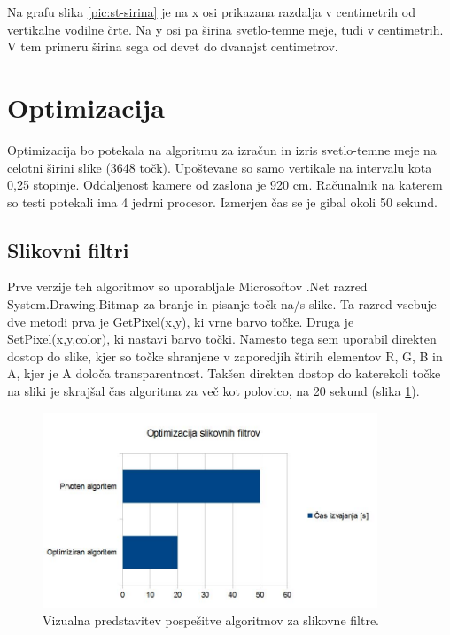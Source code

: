 \documentclass[oneside, a4paper, 12pt]{book}
\begin{document}
Na grafu slika \ref{pic:st-sirina} je na x osi prikazana razdalja v centimetrih od vertikalne vodilne črte. Na y osi pa širina svetlo-temne meje, tudi v centimetrih. V tem primeru širina sega od devet do dvanajst centimetrov.


\section{Optimizacija}
Optimizacija bo potekala na algoritmu za izračun in izris svetlo-temne meje na celotni širini slike (3648 točk). Upoštevane so samo vertikale na intervalu kota 0,25 stopinje. Oddaljenost kamere od zaslona je 920 cm. Računalnik na katerem so testi potekali ima 4 jedrni procesor. Izmerjen čas se je gibal okoli 50 sekund.

\subsection{Slikovni filtri}
Prve verzije teh algoritmov so uporabljale Microsoftov .Net razred System.Drawing.Bitmap za branje in pisanje točk na/s slike. Ta razred vsebuje dve metodi prva je GetPixel(x,y), ki vrne barvo točke. Druga je SetPixel(x,y,color), ki nastavi barvo točki. Namesto tega sem uporabil direkten dostop do slike, kjer so točke shranjene v zaporedjih štirih elementov R, G, B in A, kjer je A določa transparentnost. Takšen direkten dostop do katerekoli točke na sliki je skrajšal čas algoritma za več kot polovico, na 20 sekund (slika \ref{pic:opt-sf}).



\begin{figure}
\begin{center}
\includegraphics[width=10cm]{slike/optimizacija_grafi/optimizacija-slikovnih-filtrov.jpg}
\end{center}
\caption{Vizualna predstavitev pospešitve algoritmov za slikovne filtre.}
\label{pic:opt-sf}
\end{figure}
\end{document}
